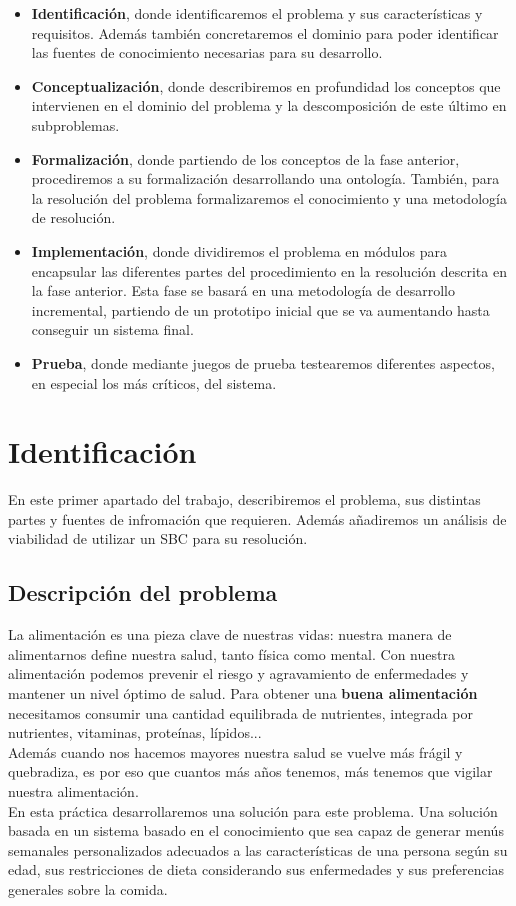 \documentclass[12]{article}
\begin{document}
\begin{itemize}
	\item \textbf{Identificación}, donde identificaremos el problema y sus características y requisitos. Además también concretaremos el dominio para poder identificar las fuentes de conocimiento necesarias para su desarrollo.%
	\item \textbf{Conceptualización}, donde describiremos en profundidad los conceptos que intervienen en el dominio del problema y la descomposición de este último en subproblemas. %
	\item \textbf{Formalización}, donde partiendo de los conceptos de la fase anterior, procediremos a su formalización desarrollando una ontología. También, para la resolución del problema formalizaremos el conocimiento y una metodología de resolución.
\item \textbf{Implementación}, donde dividiremos el problema en módulos para encapsular las diferentes partes del procedimiento en la resolución descrita en la fase anterior. Esta fase se basará en una metodología de desarrollo incremental, partiendo de un prototipo inicial que se va aumentando hasta conseguir un sistema final. 
\item \textbf{Prueba}, donde mediante juegos de prueba testearemos diferentes aspectos, en especial los más críticos, del sistema. 
\end{itemize}

\section{Identificación}
En este primer apartado del trabajo, describiremos el problema, sus distintas partes y fuentes de infromación que requieren. Además añadiremos un análisis de viabilidad de utilizar un SBC para su resolución.

\subsection{Descripción del problema}
La alimentación es una pieza clave de nuestras vidas: nuestra manera de alimentarnos define nuestra salud, tanto física como mental. Con nuestra alimentación podemos prevenir el riesgo y agravamiento de enfermedades y mantener un nivel óptimo de salud. Para obtener una \textbf{buena alimentación} necesitamos consumir una cantidad equilibrada de nutrientes, integrada por nutrientes, vitaminas, proteínas, lípidos...
\\
Además cuando nos hacemos mayores nuestra salud se vuelve más frágil y quebradiza, es por eso que cuantos más años tenemos, más tenemos que vigilar nuestra alimentación.
\\
En esta práctica desarrollaremos una solución para este problema. Una solución basada en un sistema basado en el conocimiento que sea capaz de generar menús semanales personalizados adecuados a las características de una persona según su edad, sus restricciones de dieta considerando sus enfermedades y sus preferencias generales sobre la comida.\\
\end{document}
